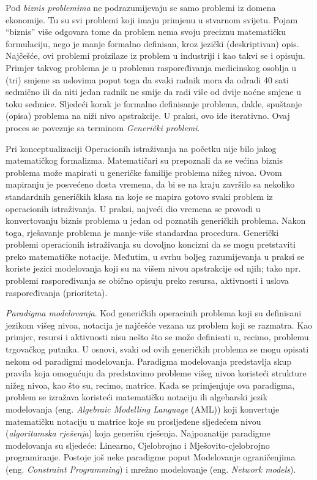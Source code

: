 \documentclass[a4paper, utf8, 11pt, colorlinks]{book}
\begin{document}
 Pod \emph{biznis problemima} ne podrazumijevaju se  samo problemi iz domena ekonomije. Tu su svi problemi koji imaju primjenu u stvarnom svijetu. Pojam ``biznis'' više odgovara tome da problem nema svoju preciznu matematičku formulaciju, nego je manje formalno definisan, kroz jezički (deskriptivan) opis.  Najčešće, ovi problemi proizilaze iz problem u industriji i kao takvi se i opisuju. Primjer takvog problema je u problemu raspoređivanja medicinskog osoblja u (tri) smjene sa uslovima poput toga da svaki radnik mora da odradi 40 sati sedmično ili da niti jedan radnik ne smije da radi više od dvije noćne smjene u toku sedmice. Sljedeći korak 
 je formalno definisanje problema, dakle, spuštanje (opisa) problema na niži nivo apstrakcije. U praksi, ovo ide iterativno. Ovaj proces se povezuje sa terminom \emph{Generički problemi}. 

Pri konceptualizaciji Operacionih istraživanja na početku nije bilo jakog matematičkog formalizma. Matematičari su prepoznali da se većina biznis problema može  mapirati u generičke familije problema nižeg nivoa. Ovom mapiranju je posvećeno dosta vremena, da bi se na kraju završilo sa nekoliko standardnih generičkih klasa na koje se mapira gotovo svaki problem iz operacionih istraživanja. U praksi, najveći dio vremena se provodi u konvertovanju biznis problema u jedan od poznatih generičkih problema. Nakon toga, rješavanje problema je manje-više standardna procedura. Generički problemi operacionih istraživanja su dovoljno koncizni da se mogu pretstaviti preko matematičke notacije. Međutim, u svrhu boljeg razumijevanja u praksi se koriste jezici modelovanja koji su na višem nivou apstrakcije od njih; tako npr. problemi raspoređivanja se obično opisuju preko resursa, aktivnosti i uslova raspoređivanja (prioriteta). 

\emph{Paradigma modelovanja}. Kod generičkih operacinih problema koji su definisani jezikom višeg nivoa, notacija je najčešće vezana uz problem koji se razmatra.
Kao primjer, resursi i aktivnosti nisu nešto što se može definisati u, recimo, problemu trgovačkog putnika. U osnovi, svaki od ovih generičkih problema se mogu opisati nekom od paradigmi modelovanja. Paradigma modelovanja predstavlja skup pravila koja omogućuju da predstavimo probleme višeg nivoa koristeći strukture nižeg nivoa, kao što su, recimo, matrice. Kada se primjenjuje ova paradigma, problem se izražava koristeći matematičku notaciju ili algebarski jezik modelovanja (eng. \emph{Algebraic Modelling Language} (AML)) koji konvertuje matematičku notaciju u matrice koje su prosljeđene sljedećem nivou (\emph{algoritamska rješenja}) koja generišu rješenja. Najpoznatije paradigme modelovanja su sljedeće: Linearno, Cjelobrojno i Mješovito-cjelobrojno programiranje. Postoje još neke paradigme poput Modelovanje ograničenjima (eng. \emph{Constraint Programming}) i mrežno modelovanje (eng. \emph{Network models}). 
\end{document}
